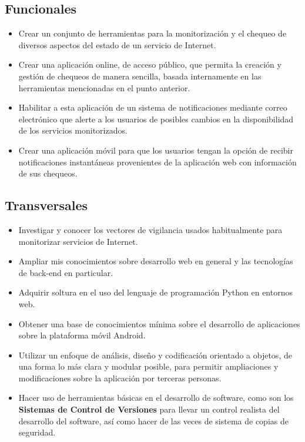 \subsection{Funcionales}
\begin{itemize}
\item Crear un conjunto de herramientas para la monitorización y el chequeo de
  diversos aspectos del estado de un servicio de Internet.
\item Crear una aplicación online, de acceso público, que permita la creación y
  gestión de chequeos de manera sencilla, basada internamente en las
  herramientas mencionadas en el punto anterior.
\item Habilitar a esta aplicación de un sistema de notificaciones mediante correo
  electrónico que alerte a los usuarios de posibles cambios en la disponibilidad
  de los servicios monitorizados.
\item Crear una aplicación móvil para que los usuarios tengan la opción de
  recibir notificaciones instantáneas provenientes de la aplicación web con
  información de sus chequeos.
\end{itemize}

\subsection{Transversales}
\begin{itemize}
\item Investigar y conocer los vectores de vigilancia usados habitualmente para
  monitorizar servicios de Internet.
\item Ampliar mis conocimientos sobre desarrollo web en general y las
  tecnologías de back-end en particular.
\item Adquirir soltura en el uso del lenguaje de programación Python en entornos
  web.
\item Obtener una base de conocimientos mínima sobre el desarrollo de
  aplicaciones sobre la plataforma móvil Android.
\item Utilizar un enfoque de análisis, diseño y codificación orientado
  a objetos, de una forma lo más clara y modular posible, para
  permitir ampliaciones y modificaciones sobre la aplicación por
  terceras personas.
\item Hacer uso de herramientas básicas en el desarrollo de software,
  como son los \textbf{Sistemas de Control de Versiones} para llevar
  un control realista del desarrollo del software, así como hacer de
  las veces de sistema de copias de seguridad.
\end{itemize}

